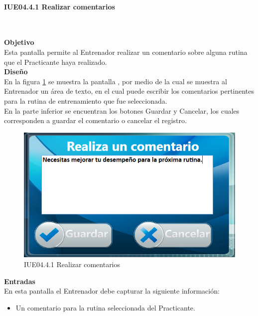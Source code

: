 \paragraph{IUE04.4.1 Realizar comentarios} \hspace{1cm}\\ 
\label{pant:IUE04.4.1} 

\textbf{\textcolor[rgb]{0, 0, 0.545098}{Objetivo}}\\
Esta pantalla permite al Entrenador realizar un comentario sobre alguna rutina que el Practicante haya realizado.\\

\textbf{\textcolor[rgb]{0, 0, 0.545098}{Diseño}}\\
En la figura \ref{fig:IUE04.4.1} se muestra la pantalla , por medio de la cual se muestra al Entrenador un área de texto, en el cual puede escribir los comentarios pertinentes para la rutina de entrenamiento que fue seleccionada.\\

En la parte inferior se encuentran los botones Guardar y Cancelar, los cuales corresponden a guardar el comentario o cancelar el registro.

\begin{figure}[H]
	\centering
		\includegraphics[scale=0.8]{./Figuras/Pantallas/IUE04_4_1Realizar_comentarios}
	\caption{IUE04.4.1 Realizar comentarios}
	\label{fig:IUE04.4.1}
\end{figure}

\textbf{\textcolor[rgb]{0, 0, 0.545098}{Entradas}}\\
En esta pantalla el Entrenador debe capturar la siguiente información:

\begin{itemize}
	\item Un comentario para la rutina seleccionada del Practicante.
\end{itemize}
\vspace{1em}

